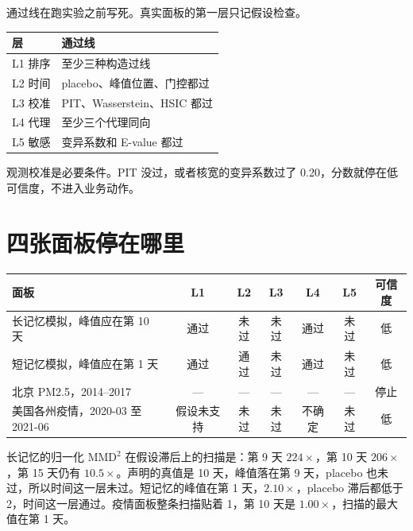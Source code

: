 \documentclass[11pt]{article}
\begin{document}
通过线在跑实验之前写死。真实面板的第一层只记假设检查。

\begin{center}
\small
\begin{tabular}{@{}lp{}@{}}
\toprule
层 & 通过线 \\
\midrule
L1 排序 & 至少三种构造过线 \\
L2 时间 & placebo、峰值位置、门控都过 \\
L3 校准 & PIT、Wasserstein、HSIC 都过 \\
L4 代理 & 至少三个代理同向 \\
L5 敏感 & 变异系数和 E-value 都过 \\
\bottomrule
\end{tabular}
\end{center}

观测校准是必要条件。PIT 没过，或者核宽的变异系数过了 0.20，分数就停在低可信度，不进入业务动作。

\section{四张面板停在哪里}

\begin{center}
\small
\begin{tabular}{@{}lcccccc@{}}
\toprule
面板 & L1 & L2 & L3 & L4 & L5 & 可信度 \\
\midrule
长记忆模拟，峰值应在第 10 天 & 通过 & 未过 & 未过 & 通过 & 未过 & 低 \\
短记忆模拟，峰值应在第 1 天 & 通过 & 通过 & 未过 & 通过 & 未过 & 低 \\
北京 PM2.5，2014--2017 & --- & --- & --- & --- & --- & 停止 \\
美国各州疫情，2020-03 至 2021-06 & 假设未支持 & 未过 & 未过 & 不确定 & 未过 & 低 \\
\bottomrule
\end{tabular}
\end{center}

长记忆的归一化 \(\mathrm{MMD}^{2}\) 在假设滞后上的扫描是：第 9 天 \(224\times\)，第 10 天 \(206\times\)，第 15 天仍有 \(10.5\times\)。声明的真值是 10 天，峰值落在第 9 天，placebo 也未过，所以时间这一层未过。短记忆的峰值在第 1 天，\(2.10\times\)，placebo 滞后都低于 2，时间这一层通过。疫情面板整条扫描贴着 1，第 10 天是 \(1.00\times\)，扫描的最大值在第 1 天。
\end{document}
